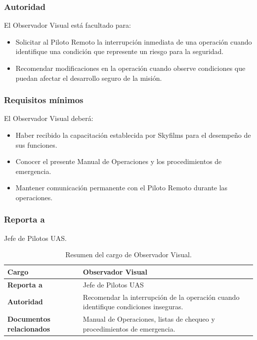 \subsubsection*{Autoridad}

El Observador Visual está facultado para:

\begin{itemize}

\item Solicitar al Piloto Remoto la interrupción inmediata de una operación cuando identifique una condición que represente un riesgo para la seguridad.

\item Recomendar modificaciones en la operación cuando observe condiciones que puedan afectar el desarrollo seguro de la misión.

\end{itemize}

\subsubsection*{Requisitos mínimos}

El Observador Visual deberá:

\begin{itemize}

\item Haber recibido la capacitación establecida por Skyfilms para el desempeño de sus funciones.

\item Conocer el presente Manual de Operaciones y los procedimientos de emergencia.

\item Mantener comunicación permanente con el Piloto Remoto durante las operaciones.

\end{itemize}


\subsubsection*{Reporta a}

Jefe de Pilotos UAS.

\begin{table}[H]
\centering
\renewcommand{\arraystretch}{1.3}

\begin{tabularx}{\textwidth}{|p{4cm}|X|}
\hline
\textbf{Cargo} & Observador Visual \\ \hline
\textbf{Reporta a} & Jefe de Pilotos UAS \\ \hline
\textbf{Autoridad} & Recomendar la interrupción de la operación cuando identifique condiciones inseguras. \\ \hline
\textbf{Documentos relacionados} & Manual de Operaciones, listas de chequeo y procedimientos de emergencia. \\ \hline
\end{tabularx}

\caption{Resumen del cargo de Observador Visual.}

\end{table}



